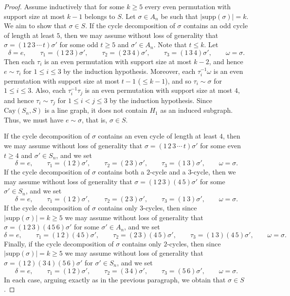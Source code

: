 \documentclass[12pt, a4paper]{article}
\theoremstyle{definition}
\begin{document}
\begin{proof}
Assume inductively that for some $k\ge 5$ every even permutation with support size at most $k-1$ belongs to $S$. Let $\sigma\in A_n$ be such that $|\mathrm{supp}(\sigma)|=k$. We aim to show that $\sigma\in S$. If the cycle decomposition of $\sigma$ contains an odd cycle of length at least $5$, then we may assume without loss of generality that
\(
\sigma=(1\,2\,3\,\cdots\,t)\sigma'
\)
for some odd $t\ge 5$ and $\sigma' \in A_n$. Note that $t \le k$. Let
\[
\delta=e,\qquad
\tau_1=(1\,2\,3)\sigma',\qquad
\tau_2=(2\,3\,4)\sigma',\qquad
\tau_3=(1\,3\,4)\sigma',\qquad
\omega=\sigma.
\]
Then each $\tau_i$ is an even permutation with support size at most $k-2$, and hence $e\sim\tau_i$ for $1\le i\le 3$ by the induction hypothesis. Moreover, each $\tau_i^{-1}\omega$ is an even permutation with support size at most $t-1$ ($\le k-1$), and so $\tau_i \sim \sigma$ for $1\le i\le 3$. Also, each $\tau_i^{-1}\tau_j$ is an even permutation with support size at most $4$, and hence $\tau_i\sim\tau_j$ for $1\le i<j\le 3$ by the induction hypothesis. Since $\mathrm{Cay}(S_n,S)$ is a line graph, it does not contain $H_1$ as an induced subgraph. Thus, we must have $e \sim \sigma$, that is, $\sigma\in S$.

If the cycle decomposition of $\sigma$ contains an even cycle of length at least $4$, then we may assume without loss of generality that
\(
\sigma=(1\,2\,3\,\cdots\,t)\sigma'
\)
for some even $t\ge 4$ and $\sigma' \in S_n$, and we set
\[
\delta=e,\qquad
\tau_1=(1\,2)\sigma',\qquad
\tau_2=(2\,3)\sigma',\qquad
\tau_3=(1\,3)\sigma',\qquad
\omega=\sigma.
\]
If the cycle decomposition of $\sigma$ contains both a $2$-cycle and a $3$-cycle, then we may assume without loss of generality that
\(
\sigma=(1\,2\,3)(4\,5)\sigma'
\)
for some $\sigma' \in S_n$, and we set
\[
\delta=e,\qquad
\tau_1=(1\,2)\sigma',\qquad
\tau_2=(2\,3)\sigma',\qquad
\tau_3=(1\,3)\sigma',\qquad
\omega=\sigma.
\]
If the cycle decomposition of $\sigma$ contains only $3$-cycles, then since $|\mathrm{supp}(\sigma)|=k\ge 5$ we may assume without loss of generality that
\(
\sigma=(1\,2\,3)(4\,5\,6)\sigma'
\)
for some $\sigma' \in A_n$, and we set 
\[
\delta=e,\qquad
\tau_1=(1\,2)(4\,5)\sigma',\qquad
\tau_2=(2\,3)(4\,5)\sigma',\qquad
\tau_3=(1\,3)(4\,5)\sigma',\qquad
\omega=\sigma.
\]
Finally, if the cycle decomposition of $\sigma$ contains only $2$-cycles, then since $|\mathrm{supp}(\sigma)|=k\ge 5$ we may assume without loss of generality that
\(
\sigma=(1\,2)(3\,4)(5\,6)\sigma'
\)
for $\sigma' \in S_n$, and we set
\[
\delta=e,\qquad
\tau_1=(1\,2)\sigma',\qquad
\tau_2=(3\,4)\sigma',\qquad
\tau_3=(5\,6)\sigma',\qquad
\omega=\sigma.
\]
In each case, arguing exactly as in the previous paragraph, we obtain that $\sigma\in S$.


\end{proof}
\end{document}
